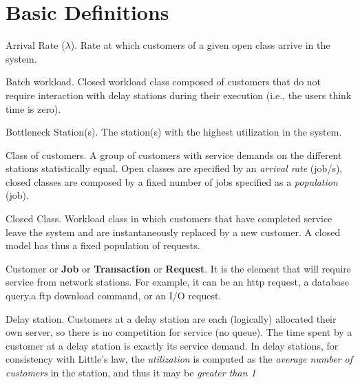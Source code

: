 
%
\chapter{Basic Definitions}
\label{cha:glossary}
\begin{description*}
\item[Arrival Rate ($\lambda$).] Rate at which customers of a given open
class arrive in the system.  %
\item[Batch workload.] Closed workload class composed of customers that do not require interaction with delay stations during their execution (i.e., the users think time is zero).
\item[Bottleneck Station(s).] The station(s) with the highest
utilization in the system.
\item[Class of customers.] A group of customers with service
demands on the different stations statistically equal. Open
classes are specified by an \emph{arrival rate} (job/s), closed
classes are composed by a fixed number of jobs specified as a
\emph{population} (job). \item[Closed Class.] Workload class in
which customers that have completed service leave the system and
are instantaneously replaced by a new customer. A closed model has
thus a fixed population of requests. \item[Customer] or
\textbf{Job} or \textbf{Transaction} or \textbf{Request}. It is
the element that will require service from network stations. For
example, it can be an {http request}, a {database query},a {ftp
download command}, or an I/O request. \item[Delay station.]
Customers at a delay station are each (logically) allocated their
own server, so there is no competition for service (no queue). The
time spent by a customer at a delay station is exactly its service
demand. In delay stations, for consistency with Little's law, the
\emph{utilization} is computed as the \emph{average number of
customers} in the station, and thus it may be \emph{greater than
1}


\end{description*}
